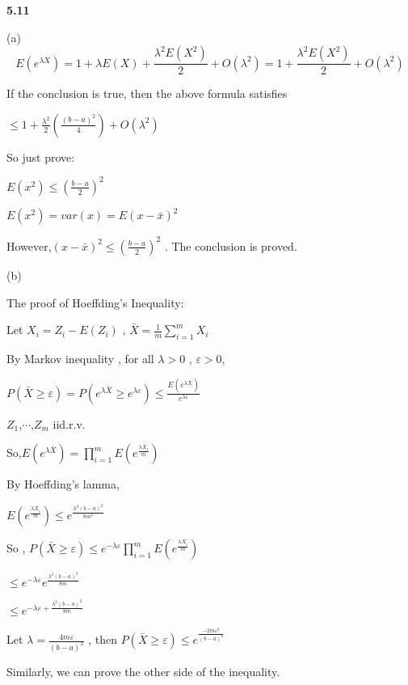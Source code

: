 \noindent\textbf{5.11}




(a)
\begin{equation}
E(e^{\lambda X}) = 1+\lambda E(X)+\frac{\lambda^2 E(X^2)}{2}+O(\lambda^2) =1+\frac{\lambda^2 E(X^2)}{2}+O(\lambda^2)
\end{equation}

If the conclusion is true, then the above formula satisfies

$\leq 1+\frac{\lambda^2}{2}(\frac{(b-a)^2}{4})+O(\lambda^2)$

So just prove:

$E(x^2)\leq (\frac{b-a}{2})^2$

$E(x^2)=var(x)=E(x-\bar{x})^2$

However,$(x-\bar{x})^2\leq(\frac{b-a}{2})^2$ . The conclusion is proved.

(b)

The proof of Hoeffding's Inequality:

Let $X_i = Z_i - E(Z_i)$ , $\bar{X} = \frac{1}{m}\sum_{i=1}^{m}X_i$

By Markov inequality , for all $\lambda >0$ , $\varepsilon > 0$,

$P(\bar{X}\geq\varepsilon) = P(e^{\lambda \bar{X}} \geq e^{\lambda\varepsilon}) \leq \frac{E(e^{\lambda \bar{X}})}{e^{\lambda\varepsilon}}$

$Z_1$,$\cdots$,$Z_m$ iid.r.v.

So,$E(e^{\lambda \bar{X}}) = \prod_{i=1}^{m} E(e^{\frac{\lambda X_i}{m}})$

By Hoeffding's lamma,

$ E(e^{\frac{\lambda X_i}{m}}) \leq e^{\frac{\lambda^2(b-a)^2}{8m^2}}$

So , $P(\bar{X}\geq\varepsilon) \leq e^{-\lambda\varepsilon}\prod_{i=1}^{m} E(e^{\frac{\lambda X_i}{m}})$

$\leq e^{-\lambda\varepsilon}e^{\frac{\lambda^2(b-a)^2}{8m}}$

$\leq e^{-\lambda\varepsilon+\frac{\lambda^2(b-a)^2}{8m}}$

Let $\lambda = \frac{4m\varepsilon}{(b-a)^2}$ , then $P(\bar{X}\geq \varepsilon) \leq e^{\frac{-2m\varepsilon^2}{(b-a)^2}}$

Similarly, we can prove the other side of the inequality.

